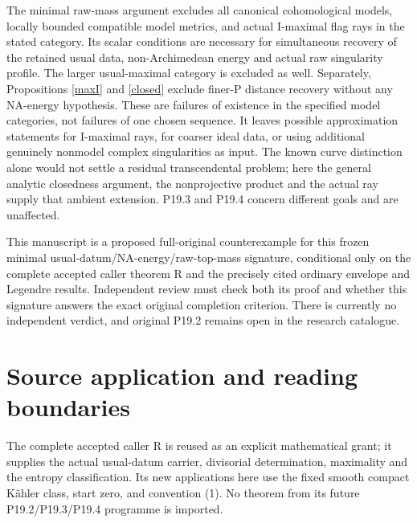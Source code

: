 \documentclass[11pt]{article}
\begin{document}
The minimal raw-mass argument excludes all canonical cohomological
models, locally bounded compatible model metrics, and actual I-maximal
flag rays in the stated category. Its scalar conditions are necessary
for simultaneous recovery of the retained usual data, non-Archimedean
energy and actual raw singularity profile. The larger usual-maximal
category is excluded as well. Separately, Propositions \ref{maxI} and
\ref{closed} exclude finer-P distance recovery without any NA-energy
hypothesis. These are failures of existence in the specified model
categories, not failures of one chosen sequence. It leaves possible
approximation statements for I-maximal rays, for coarser ideal data,
or using additional genuinely nonmodel complex singularities as
input. The known curve distinction alone would not settle a residual
transcendental problem; here the general analytic closedness argument,
the nonprojective product and the actual ray supply that ambient
extension. P19.3 and P19.4 concern different goals and are unaffected.

This manuscript is a proposed full-original counterexample for this
frozen minimal usual-datum/NA-energy/raw-top-mass signature, conditional
only on the complete
accepted caller theorem R and the precisely cited ordinary envelope
and Legendre results. Independent review must check both its proof
and whether this signature answers the exact original completion
criterion. There is currently no independent verdict, and original
P19.2 remains open in the research catalogue.

\appendix
\section{Source application and reading boundaries}
The complete accepted caller R is reused as an explicit mathematical
grant; it supplies the actual usual-datum carrier, divisorial
determination, maximality and the entropy classification. Its new
applications here use the fixed smooth compact K\"ahler class,
start zero, and convention (1). No theorem from its future
P19.2/P19.3/P19.4 programme is imported.
\end{document}
